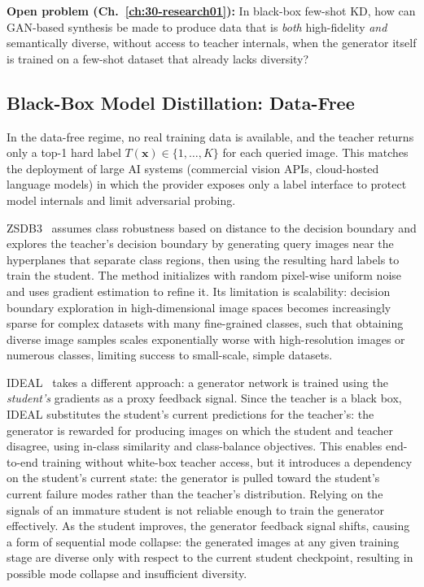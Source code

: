 \documentclass[12pt, a4paper, twoside]{book}
\numberwithin{equation}{chapter}
\theoremstyle{plain}
\theoremstyle{definition}
\theoremstyle{remark}
\newenvironment{foldable}{}{}
\begin{document}
\begin{foldable}
  \textbf{Open problem (Ch.~\ref{ch:30-research01}):}
  In black-box few-shot \ac{KD}, how can GAN-based synthesis be made to produce data that is \textit{both} high-fidelity \textit{and} semantically diverse, without access to teacher internals, when the generator itself is trained on a few-shot dataset that already lacks diversity?
\end{foldable}

\subsection{Black-Box Model Distillation: Data-Free} \label{sec:24-background-kdrestricted-bbdatafree}
\begin{foldable}
  In the data-free regime, no real training data is available, and the teacher returns only a top-1 hard label $T(\mathbf{x}) \in \{1, \ldots, K\}$ for each queried image.
  This matches the deployment of large \ac{AI} systems (commercial vision \acp{API}, cloud-hosted language models) in which the provider exposes only a label interface to protect model internals and limit adversarial probing.
\end{foldable}

\begin{foldable}
  ZSDB3~\cite{wang2021zero} assumes class robustness based on distance to the decision boundary and explores the teacher's decision boundary by generating query images near the hyperplanes that separate class regions, then using the resulting hard labels to train the student.
  The method initializes with random pixel-wise uniform noise and uses gradient estimation to refine it.
  Its limitation is scalability: decision boundary exploration in high-dimensional image spaces becomes increasingly sparse for complex datasets with many fine-grained classes, such that obtaining diverse image samples scales exponentially worse with high-resolution images or numerous classes, limiting success to small-scale, simple datasets.
\end{foldable}

\begin{foldable}
  IDEAL~\cite{zhang2022ideal} takes a different approach: a generator network is trained using the \textit{student's} gradients as a proxy feedback signal.
  Since the teacher is a black box, IDEAL substitutes the student's current predictions for the teacher's: the generator is rewarded for producing images on which the student and teacher disagree, using in-class similarity and class-balance objectives.
  This enables end-to-end training without white-box teacher access, but it introduces a dependency on the student's current state: the generator is pulled toward the student's current failure modes rather than the teacher's distribution.
  Relying on the signals of an immature student is not reliable enough to train the generator effectively.
  As the student improves, the generator feedback signal shifts, causing a form of sequential mode collapse: the generated images at any given training stage are diverse only with respect to the current student checkpoint, resulting in possible mode collapse and insufficient diversity.
\end{foldable}
\end{document}
